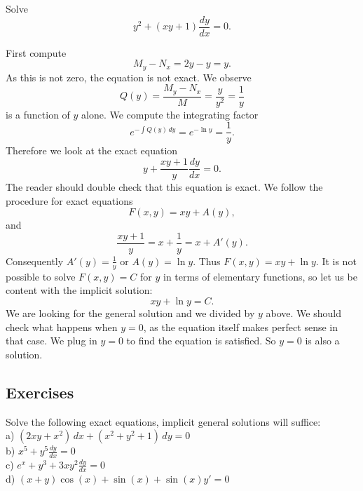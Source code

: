 \documentclass[12pt]{book}
\begin{document}
\begin{example}
Solve
\begin{equation*}
y^2 + (xy+1) \frac{dy}{dx} = 0 .
\end{equation*}

First compute
\begin{equation*}
M_y-N_x = 2y-y = y .
\end{equation*}
As this is not zero, the equation is not exact.  We observe
\begin{equation*}
Q(y) = \frac{M_y-N_x}{M} = \frac{y}{y^2} = \frac{1}{y} 
\end{equation*}
is a function of $y$ alone.    We compute the integrating factor
\begin{equation*}
e^{-\int  Q(y) \, dy}
=
e^{-\ln y} = \frac{1}{y} .
\end{equation*}
Therefore we look at the exact equation
\begin{equation*}
y + \frac{xy+1}{y} \frac{dy}{dx} = 0 .
\end{equation*}
The reader should double check that this equation is exact.
We follow the procedure for exact equations
\begin{equation*}
F(x,y) = xy + A(y) ,
\end{equation*}
and
\begin{equation}
\frac{xy+1}{y} = x+\frac{1}{y} = x+ A'(y) .
\end{equation}
Consequently $A'(y) = \frac{1}{y}$ or $A(y) = \ln y$.  Thus $F(x,y) = xy + \ln y$.
It is not possible to solve $F(x,y)=C$ for $y$
in terms of elementary functions, so 
let us be content with the implicit solution:
\begin{equation*}
xy + \ln y = C .
\end{equation*}
We are looking for the general solution and we divided by
$y$ above.  We should check what happens when $y=0$, as the equation itself
makes perfect sense in that case.  We plug in $y=0$ to find the
equation is satisfied.  So $y=0$ is also a solution.
\end{example}

\subsection{Exercises}

\begin{exercise}
Solve the following exact equations, implicit general solutions
will suffice:\\
a)
$(2 xy + x^2) \, dx + (x^2+y^2+1) \, dy = 0$
\\
b)
$x^5 + y^5 \frac{dy}{dx} = 0$
\\
c)
$e^x+y^3 + 3xy^2 \frac{dy}{dx} = 0$
\\
d)
$(x+y)\cos(x)+\sin(x) + \sin(x)y' = 0$
\end{exercise}
\end{document}
